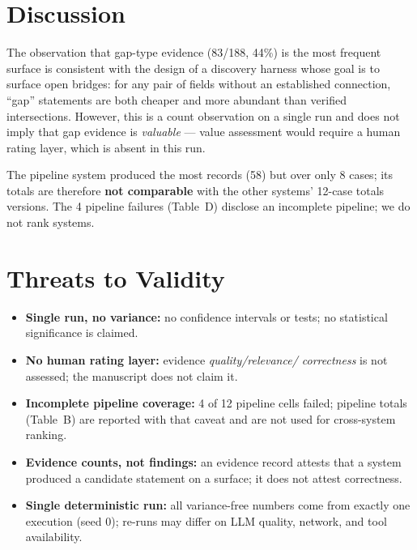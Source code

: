 \documentclass[11pt]{article}
\begin{document}
\section{Discussion}
\label{sec:disc}
The observation that gap-type evidence (83/188, 44\%) is the most frequent
surface is consistent with the design of a discovery harness whose goal is to
surface open bridges: for any pair of fields without an established connection,
``gap'' statements are both cheaper and more abundant than verified
intersections. However, this is a count observation on a single run and does not
imply that gap evidence is \emph{valuable} --- value assessment would require a
human rating layer, which is absent in this run.

The pipeline system produced the most records (58) but over only 8 cases; its
totals are therefore \textbf{not comparable} with the other systems' 12-case
totals versions. The 4 pipeline failures (Table~D) disclose an incomplete
pipeline; we do not rank systems.

\section{Threats to Validity}
\label{sec:threats}
\begin{itemize}
    \item \textbf{Single run, no variance:} no confidence intervals or tests;
    no statistical significance is claimed.
    \item \textbf{No human rating layer:} evidence \emph{quality/relevance/
    correctness} is not assessed; the manuscript does not claim it.
    \item \textbf{Incomplete pipeline coverage:} 4 of 12 pipeline cells failed;
    pipeline totals (Table~B) are reported with that caveat and are not used for
    cross-system ranking.
    \item \textbf{Evidence counts, not findings:} an evidence record attests
    that a system produced a candidate statement on a surface; it does not
    attest correctness.
    \item \textbf{Single deterministic run:} all variance-free numbers come from
    exactly one execution (seed 0); re-runs may differ on LLM quality, network,
    and tool availability.
\end{itemize}
\end{document}
